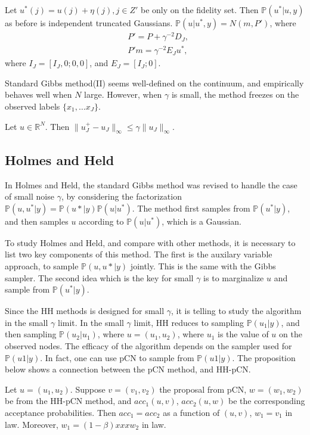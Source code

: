 \documentclass[final]{siamart0516}
\newcommand{\bbP}{\mathbb{P}}
\begin{document}
Let $u^*(j)=u(j)+\eta(j), j \in Z'$ be only on the fidelity set. Then $\bbP(u^*|u,y)$ as before is independent truncated Gaussians. 
$\bbP(u|u^*,y) = N(m, P')$, where 
\begin{align*}
&P'=P+\gamma^{-2}D_J,\\
&P'm=\gamma^{-2}E_Ju^*, 
\end{align*}
where $I_J = [I_J, 0; 0, 0]$, and $E_J = [I_J; 0]$. 


Standard Gibbs method(II) seems well-defined on the continuum, and empirically behaves well when $N$ large. However, when $\gamma$ is small, the method freezes on the observed labels $\{x_1, \dots x_J\}$. 
\begin{proposition}
Let $u \in \mathbb{R}^N$. Then $\|u^+_J - u_J\|_\infty \leq \gamma \|u_J\|_\infty$. 
\end{proposition}

\subsection{Holmes and Held}
In Holmes and Held, the standard Gibbs method was revised to handle the case of small noise $\gamma$, by considering the factorization $\bbP(u, u^* |y) = \bbP(u*|y)\bbP(u|u^*)$. The method first samples from $\bbP(u^*|y)$, and then samples $u$ according to $\bbP(u|u^*)$, which is a Gaussian. 

To study Holmes and Held, and compare with other methods, it is necessary to list two key components of this method. The first is the auxilary variable approach, to sample $\bbP(u, u*|y)$ jointly. This is the same with the Gibbs sampler.  The second idea which is the key for small $\gamma$ is to marginalize $u$ and sample from $\bbP(u^*|y)$. 

Since the HH methods is designed for small $\gamma$, it is telling to study the algorithm in the small $\gamma$ limit. 
In the small $\gamma$ limit, HH reduces to sampling $\bbP(u_1|y)$, and then sampling $\bbP(u_2|u_1)$, where $u = (u_1, u_2)$, where $u_1$ is the value of $u$ on the observed nodes.  The efficacy of the algorithm depends on the sampler used for $\bbP(u1|y)$. In fact, one can use pCN to sample from $\bbP(u1|y)$. The proposition below shows a connection between the pCN method, and HH-pCN.

\begin{proposition}
Let $u = (u_1, u_2)$. Suppose $v = (v_1, v_2)$ the proposal from pCN, $w = (w_1, w_2)$ be from the HH-pCN method, and $acc_1(u, v)$, $acc_2(u,w)$ be the corresponding acceptance probabilities. Then $acc_1 = acc_2$ as a function of $(u,v)$, $w_1 = v_1$ in law. Moreover, $w_1 = (1 - \beta) xxx w_2$ in law. 
\end{proposition}
\end{document}

